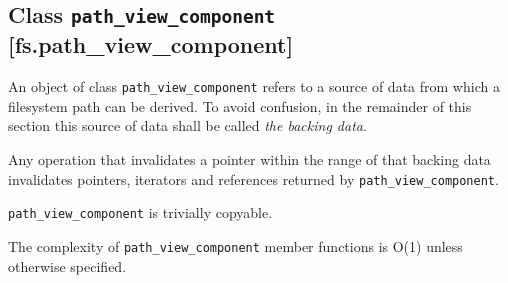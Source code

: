\documentclass[11pt]{article}
\newcommand{\code}[2][cpp]{\lstinline[language=#1,basicstyle=\small\ttfamily]{#2}}
\begin{document}
\subsection*{Class \code{path_view_component} [fs.path\_view\_component]}

An object of class \code{path_view_component} refers to a source of data from which a filesystem path can be derived. To avoid confusion, in the remainder of this section this source of data shall be called \emph{the backing data}.

Any operation that invalidates a pointer within the range of that backing data invalidates pointers, iterators and references returned by \code{path_view_component}.

\code{path_view_component} is trivially copyable.

The complexity of \code{path_view_component} member functions is O(1) unless otherwise specified.
\end{document}
